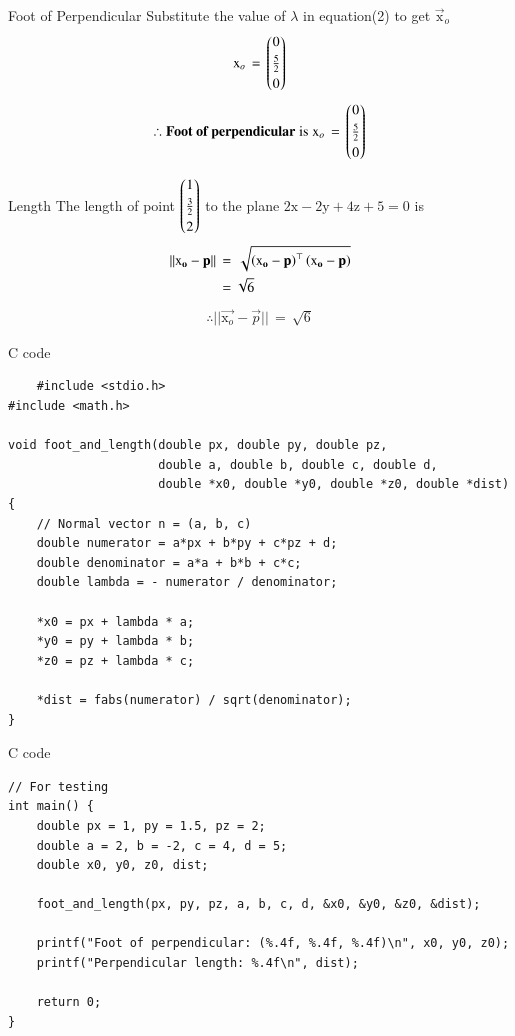 \documentclass{beamer}
\begin{document}
\begin{frame}{Foot of Perpendicular}
    Substitute the value of $\lambda$ in equation(2) to get $\vec{\text{x}}_o$
\begin{align}
    \mathbf{\text{x}}_o\,=\,\begin{pmatrix}0\\[3pt]\frac{5}{2}\\[3pt]0\end{pmatrix}
\end{align}
\begin{align*}
    \therefore \textbf{Foot of perpendicular}\; \text{is}\; \mathbf{\text{x}}_o\,=\,\begin{pmatrix}0\\[3pt]\frac{5}{2}\\[3pt]0\end{pmatrix}
    \end{align*}
\end{frame}

\begin{frame}{Length}
    The length of point $\begin{pmatrix}1\\[3pt]\frac{3}{2}\\[3pt]2\end{pmatrix}$ to the plane $2\text{x}-2\text{y}+4\text{z}+5=0$ is
\begin{align}
    ||\mathbf{\text{x}_o}-\mathbf{p}||\,&=\,\sqrt{\left(\mathbf{\text{x}_o}-\mathbf{p}\right)^\top\left(\mathbf{\text{x}_o}-\mathbf{p}\right)}\\
    &=\sqrt{6}
\end{align}
\begin{align*}
    \therefore ||\vec{\text{x}_o}-\vec{p}||\,=\,\sqrt{6}
\end{align*}
\end{frame}

\begin{frame}[fragile]{C code}
\begin{lstlisting}
    #include <stdio.h>
#include <math.h>

void foot_and_length(double px, double py, double pz,
                     double a, double b, double c, double d,
                     double *x0, double *y0, double *z0, double *dist) {
    // Normal vector n = (a, b, c)
    double numerator = a*px + b*py + c*pz + d;
    double denominator = a*a + b*b + c*c;
    double lambda = - numerator / denominator;

    *x0 = px + lambda * a;
    *y0 = py + lambda * b;
    *z0 = pz + lambda * c;

    *dist = fabs(numerator) / sqrt(denominator);
}
\end{lstlisting}
\end{frame}

\begin{frame}[fragile]{C code}
\begin{lstlisting}
// For testing
int main() {
    double px = 1, py = 1.5, pz = 2;
    double a = 2, b = -2, c = 4, d = 5;
    double x0, y0, z0, dist;

    foot_and_length(px, py, pz, a, b, c, d, &x0, &y0, &z0, &dist);

    printf("Foot of perpendicular: (%.4f, %.4f, %.4f)\n", x0, y0, z0);
    printf("Perpendicular length: %.4f\n", dist);

    return 0;
}
\end{lstlisting}
\end{frame}
\end{document}
